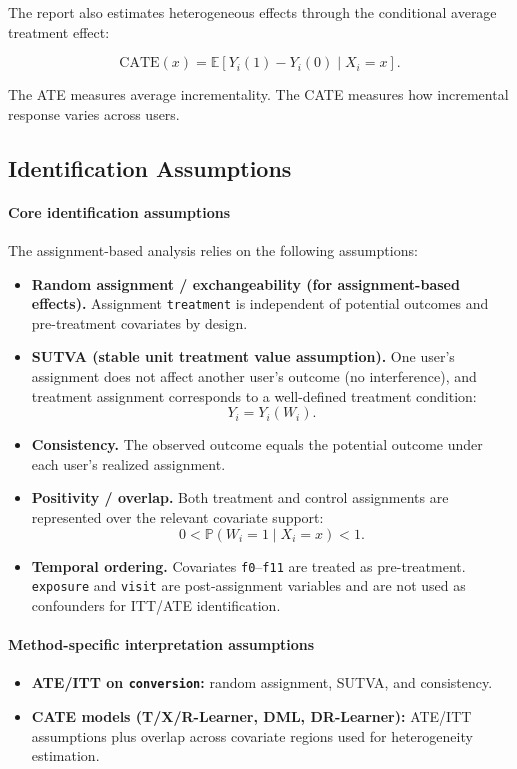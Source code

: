 \documentclass[journal,11pt,onecolumn]{IEEEtran}
\newcommand{\E}{\mathbb{E}}
\newcommand{\Prob}{\mathbb{P}}
\newcommand{\CATE}{\mathrm{CATE}}
\begin{document}
The report also estimates heterogeneous effects through the conditional average treatment effect:

\[
    \CATE(x)=\E[Y_i(1)-Y_i(0)\mid X_i=x].
\]

The ATE measures average incrementality. The CATE measures how incremental response varies across users.

\subsection{Identification Assumptions}

\paragraph{Core identification assumptions}
The assignment-based analysis relies on the following assumptions:
\begin{itemize}
    \item \textbf{Random assignment / exchangeability (for assignment-based effects).}
          Assignment \texttt{treatment} is independent of potential outcomes and
          pre-treatment covariates by design.
    \item \textbf{SUTVA (stable unit treatment value assumption).}
          One user's assignment does not affect another user's outcome (no
          interference), and treatment assignment corresponds to a well-defined
          treatment condition:
          \[
              Y_i = Y_i(W_i).
          \]
    \item \textbf{Consistency.}
          The observed outcome equals the potential outcome under each user's realized
          assignment.
    \item \textbf{Positivity / overlap.}
          Both treatment and control assignments are represented over the relevant
          covariate support:
          \[
              0 < \Prob(W_i=1\mid X_i=x) < 1.
          \]
    \item \textbf{Temporal ordering.}
          Covariates \texttt{f0}--\texttt{f11} are treated as pre-treatment.
          \texttt{exposure} and \texttt{visit} are post-assignment variables and are
          not used as confounders for ITT/ATE identification.
\end{itemize}

\paragraph{Method-specific interpretation assumptions}
\begin{itemize}
    \item \textbf{ATE/ITT on \texttt{conversion}:} random assignment,
          SUTVA, and consistency.
    \item \textbf{CATE models (T/X/R-Learner, DML, DR-Learner):} ATE/ITT
          assumptions plus overlap across covariate regions used for heterogeneity
          estimation.
\end{itemize}
\end{document}
